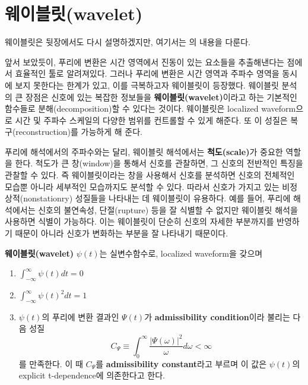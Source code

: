 \documentclass[b5paper,]{scrbook}
\theoremstyle{plain}
\theoremstyle{definition}
\numberwithin{equation}{section}
\let\BeginKnitrBlock\begin \let\EndKnitrBlock\end
\begin{document}
\section{웨이블릿(wavelet)}\label{wavelet}

웨이블릿은 뒷장에서도 다시 설명하겠지만, 여기서는 \citep{Shima2016}의
내용을 다룬다.

앞서 보았듯이, 푸리에 변환은 시간 영역에서 진동이 있는 요소들을
추출해낸다는 점에서 효율적인 툴로 알려져있다. 그러나 푸리에 변환은 시간
영역과 주파수 영역을 동시에 보지 못한다는 한계가 있고, 이를 극복하고자
웨이블릿이 등장했다. 웨이블릿 분석의 큰 장점은 신호에 있는 복잡한
정보들을 \textbf{웨이블릿(wavelet)}이라고 하는 기본적인 함수들로
분해(decomposition)할 수 있다는 것이다. 웨이블릿은 localized
waveform으로 시간 및 주파수 스케일의 다양한 범위를 컨트롤할 수 있게
해준다. 또 이 성질은 복구(reconstruction)를 가능하게 해 준다.

푸리에 해석에서의 주파수와는 달리, 웨이블릿 해석에서는
\textbf{척도(scale)}가 중요한 역할을 한다. 척도가 큰 창(window)을 통해서
신호를 관찰하면, 그 신호의 전반적인 특징을 관찰할 수 있다. 즉
웨이블릿이라는 창을 사용해서 신호를 분석하면 신호의 전체적인 모습뿐
아니라 세부적인 모습까지도 분석할 수 있다. 따라서 신호가 가지고 있는
비정상적(nonstationry) 성질들을 나타내는 데 웨이블릿이 유용하다. 예를
들어, 푸리에 해석에서는 신호의 불연속성, 단절(rupture) 등을 잘 식별할 수
없지만 웨이블릿 해석을 사용하면 식별이 가능하다. 이는 웨이블릿이 단순히
신호의 자세한 부분까지를 반영하기 때문이 아니라 신호가 변화하는 부분을
잘 나타내기 때문이다.

\BeginKnitrBlock{definition}[웨이블릿]
\protect\hypertarget{def:unnamed-chunk-161}{}{\label{def:unnamed-chunk-161}
{} }\textbf{웨이블릿(wavelet)} \(\psi(t)\)는
실변수함수로, localized waveform을 갖으며

\begin{enumerate}
\def\labelenumi{\arabic{enumi}.}
\item
  \(\int_{-\infty}^{\infty}\psi(t)dt=0\)
\item
  \(\int_{-\infty}^{\infty}\psi(t)^{2}dt=1\)
\item
  \(\psi(t)\)의 푸리에 변환 결과인 \(\Psi(t)\)가 \textbf{admissibility
  condition}이라 불리는 다음 성질
  \[C_{\Psi}\equiv\int_{0}^{\infty}\frac{|\Psi(\omega) |^{2}}{\omega}d\omega <\infty\]
  를 만족한다. 이 때 \(C_{\Psi}\)를 \textbf{admissibility constant}라고
  부르며 이 값은 \(\psi(t)\)의 explicit t-dependence에 의존한다고 한다.
\end{enumerate}
\EndKnitrBlock{definition}
\end{document}
